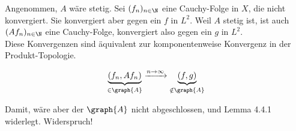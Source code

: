 \begin{solution}
\begin{enumerate}
\begin{itemize}
    Angenommen, $A$ wäre stetig.
    Sei $(f_n)_{n \in \N}$ eine Cauchy-Folge in $X$, die nicht konvergiert.
    Sie konvergiert aber gegen ein $f$ in $L^2$.
    Weil $A$ stetig ist, ist auch $(A f_n)_{n \in \N}$ eine Cauchy-Folge, konvergiert also gegen ein $g$ in $L^2$. \\

    Diese Konvergenzen sind äquivalent zur komponentenweise Konvergenz in der Produkt-Topologie.

    \begin{align*}
      \underbrace{(f_n, A f_n)}_{\in \graph{A}}
      \xrightarrow{n \to \infty}
      \underbrace{(f, g)}_{\notin \graph{A}}
    \end{align*}

    Damit, wäre aber der $\graph{A}$ nicht abgeschlossen, und Lemma 4.4.1 widerlegt.
    Widerspruch!

  \end{itemize}

\end{enumerate}

\end{solution}
